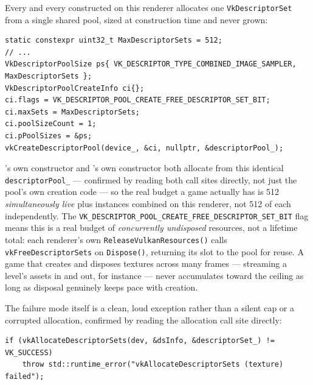 Every  and every  constructed on this renderer
allocates one \texttt{VkDescriptorSet} from a single shared pool, sized at construction time
and never grown:

\begin{lstlisting}
static constexpr uint32_t MaxDescriptorSets = 512;
// ...
VkDescriptorPoolSize ps{ VK_DESCRIPTOR_TYPE_COMBINED_IMAGE_SAMPLER, MaxDescriptorSets };
VkDescriptorPoolCreateInfo ci{};
ci.flags = VK_DESCRIPTOR_POOL_CREATE_FREE_DESCRIPTOR_SET_BIT;
ci.maxSets = MaxDescriptorSets;
ci.poolSizeCount = 1;
ci.pPoolSizes = &ps;
vkCreateDescriptorPool(device_, &ci, nullptr, &descriptorPool_);
\end{lstlisting}

's own constructor and 's
own constructor both allocate from this identical \texttt{descriptorPool\_} --- confirmed by
reading both call sites directly, not just the pool's own creation code --- so the real budget
a game actually has is 512 \emph{simultaneously live}  plus
 instances combined on this renderer, not 512 of each independently.
The \texttt{VK\_DESCRIPTOR\_POOL\_CREATE\_FREE\_DESCRIPTOR\_SET\_BIT} flag means this is a real
budget of \emph{concurrently undisposed} resources, not a lifetime total: each renderer's own
\texttt{ReleaseVulkanResources()} calls \texttt{vkFreeDescriptorSets} on \texttt{Dispose()},
returning its slot to the pool for reuse. A game that creates and disposes textures across many
frames --- streaming a level's assets in and out, for instance --- never accumulates toward the
ceiling as long as disposal genuinely keeps pace with creation.

The failure mode itself is a clean, loud exception rather than a silent cap or a corrupted
allocation, confirmed by reading the allocation call site directly:

\begin{lstlisting}
if (vkAllocateDescriptorSets(dev, &dsInfo, &descriptorSet_) != VK_SUCCESS)
    throw std::runtime_error("vkAllocateDescriptorSets (texture) failed");
\end{lstlisting}

